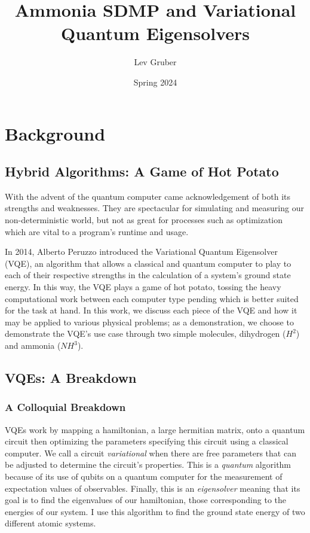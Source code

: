 \documentclass[10pt,twocolumn,letterpaper]{article}
\title{Ammonia SDMP and Variational Quantum Eigensolvers}
\author{Lev Gruber}
\date{Spring 2024}
\begin{document}
\maketitle

\section{Background}

\subsection{Hybrid Algorithms: A Game of Hot Potato}
With the advent of the quantum computer came acknowledgement of both its strengths and weaknesses. They are spectacular for simulating and measuring our non-deterministic world, but not as great for processes such as optimization which are vital to a program's runtime and usage. 

In 2014, Alberto Peruzzo introduced the Variational Quantum Eigensolver (VQE), an algorithm that allows a classical and quantum computer to play to each of their respective strengths in the calculation of a system's ground state energy. In this way, the VQE plays a game of hot potato, tossing the heavy computational work between each computer type pending which is better suited for the task at hand. In this work, we discuss each piece of the VQE and how it may be applied to various physical problems; as a demonstration, we choose to demonstrate the VQE's use case through two simple molecules, dihydrogen ($H^2$) and ammonia ($NH^3$).  
\subsection{VQEs: A Breakdown}
\subsubsection{A Colloquial Breakdown}
VQEs work by mapping a hamiltonian, a large hermitian matrix, onto a quantum circuit then optimizing the parameters specifying this circuit using a classical computer. We call a circuit \textit{variational} when there are free parameters that can be adjusted to determine the circuit's properties. This is a \textit{quantum} algorithm because of its use of qubits on a quantum computer for the measurement of expectation values of observables. Finally, this is an \textit{eigensolver} meaning that its goal is to find the eigenvalues of our hamiltonian, those corresponding to the energies of our system. I use this algorithm to find the ground state energy of two different atomic systems.
\end{document}
